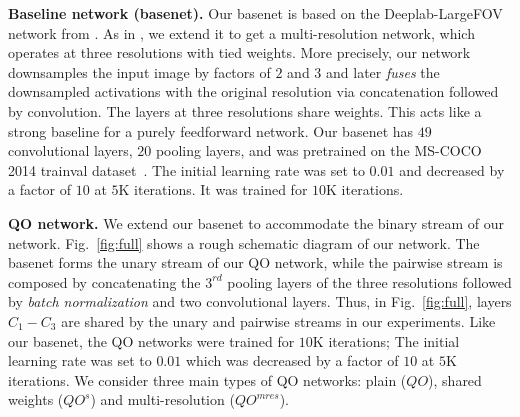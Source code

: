 \documentclass[runningheads]{llncs}
\begin{document}
\textbf{Baseline network (basenet).} Our basenet is based on the Deeplab-LargeFOV network from \cite{deeplab1}. As in \cite{edg}, we extend it to get a multi-resolution network,
which operates at three resolutions with tied weights. More precisely, our network downsamples the input image by factors of $2$ and $3$
and later \emph{fuses} the downsampled activations with the original resolution via concatenation followed by convolution. The layers at three resolutions share weights. This acts like a strong baseline for a purely feedforward network.
Our basenet has $49$ convolutional layers, $20$ pooling layers, and was pretrained on the MS-COCO 2014 trainval dataset~\cite{coco}. The initial learning rate was set to $0.01$ and decreased by a factor of $10$ at $5$K iterations. It was trained for $10$K iterations.


\textbf{QO network.} We extend our basenet to accommodate the binary stream of our network. Fig.~\ref{fig:full} shows a rough schematic diagram of our network. 
The basenet forms the unary stream of our QO network, while the pairwise stream is composed by concatenating the $3^{rd}$ pooling layers of the three resolutions followed by \emph{batch normalization} and two convolutional layers. Thus, in Fig.~\ref{fig:full}, layers $C_1-C_3$ are shared by the unary and pairwise streams in our experiments. Like our basenet, the QO networks were trained for $10$K iterations; The initial learning rate was set to $0.01$ which was decreased by a factor of $10$ at $5$K iterations.
We consider three main types of QO networks: plain ($QO$), shared weights ($QO^{s}$) and multi-resolution ($QO^{mres}$).
\end{document}
